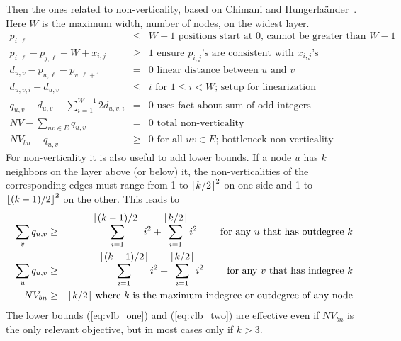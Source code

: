 Then the ones related to non-verticality, based on Chimani and Hungerla\"{a}nder~\cite{2013-IJC-Chimani}. Here $W$ is the maximum width, number of nodes, on the widest layer.
\begin{eqnarray}
    p_{i,\ell} &\leq& W - 1 \mbox{ positions start at 0, cannot be greater than $W-1$} \label{eq:width}
    \\
    p_{i,\ell} - p_{j,\ell} + W + x_{i,j} &\geq& 1 \mbox{ ensure $p_{i,j}$'s are consistent with $x_{i,j}$'s}\label{eq:consistent}
    \\
    d_{u,v} - p_{u,\ell} - p_{v,\ell+1} &=& 0 \mbox{ linear distance between $u$ and $v$} \label{eq:distance}
    \\
    d_{u,v,i} - d_{u,v} &\leq& i \mbox{ for $1\leq i < W$; setup for linearization} \label{eq:linearization}
    \\
    q_{u,v} - d_{u,v} - \sum_{i=1}^{W-1} 2 d_{u,v,i} &=& 0 \mbox{ uses fact about sum of odd integers} \label{eq:quadratic}
    \\
    NV - \sum_{uv\in E} q_{u,v} &=& 0 \mbox{ total non-verticality} \label{eq:non-verticality}
    \\
    NV_{bn} - q_{u,v} &\geq& 0 \mbox{ for all $uv\in E$; bottleneck non-verticality} \label{eq:bottleneck_nv}
\end{eqnarray}
For non-verticality it is also useful to add lower bounds. If a node $u$ has $k$ neighbors on the layer above (or below) it, the non-verticalities of the corresponding edges must range from 1 to $\mbox{$\lfloor k/2 \rfloor$}^2$ on one side and 1 to $\mbox{$\lfloor (k-1)/2 \rfloor$}^2$ on the other. This leads to
\begin{eqnarray}
\sum_{v} q_{u,v} &\geq& \sum_{i=1}^{\mbox{$\lfloor (k-1)/2 \rfloor$}} i^2 + \sum_{i=1}^{\mbox{$\lfloor k/2 \rfloor$}} i^2 \label{eq:vlb_one}
\mbox{ ~~~~~ for any $u$ that has outdegree $k$}
\\
\sum_{u} q_{u,v} &\geq& \sum_{i=1}^{\mbox{$\lfloor (k-1)/2 \rfloor$}} i^2 + \sum_{i=1}^{\mbox{$\lfloor k/2 \rfloor$}} i^2 \label{eq:vlb_two}
\mbox{ ~~~~~ for any $v$ that has indegree $k$}
\\
NV_{bn} &\geq& \mbox{$\lfloor k/2 \rfloor$} \mbox{ where $k$ is the maximum indegree or outdegree of any node} \label{eq:bnvlb}
\end{eqnarray}
The lower bounds (\ref{eq:vlb_one}) and (\ref{eq:vlb_two}) are effective even if $NV_{bn}$ is the only relevant objective, but in most cases only if $k > 3$.

